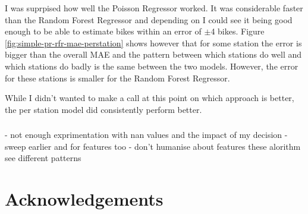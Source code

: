 \documentclass[a4paper]{article}
\begin{document}
    I was suprpised how well the Poisson Regressor worked. It was considerable faster than the Random Forest Regressor
    and depending on I could see it being good enough to be able to estimate bikes within an error of $\pm$4 bikes.
    Figure \ref{fig:simple-pr-rfr-mae-perstation} shows however that for some station the error is bigger
    than the overall MAE and the pattern between which stations do well and which stations do badly is the same between the
    two models. However, the error for these stations is smaller for the Random Forest Regressor.

    While I didn't wanted to make a call at this point on which approach is better, the per station model did consistently
    perform better.

    \subsubsection*{}
    - not enough exprimentation with nan values and the impact of my decision
    - sweep earlier and for features too
    - don't humanise about features these alorithm see different patterns

    \section*{Acknowledgements}

    
    
\end{document}
